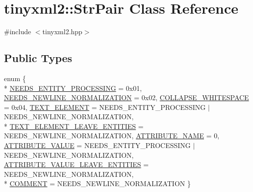 \hypertarget{classtinyxml2_1_1_str_pair}{\section{tinyxml2\-:\-:Str\-Pair Class Reference}
\label{classtinyxml2_1_1_str_pair}
}


{\ttfamily \#include $<$tinyxml2.\-hpp$>$}

\subsection*{Public Types}
\begin{DoxyCompactItemize}
\item 
enum \{ \\*
\hyperlink{classtinyxml2_1_1_str_pair_a0301ef962e15dd94574431f1c61266c5a4f1e01a55f8efe4ca72c32d454060237}{N\-E\-E\-D\-S\-\_\-\-E\-N\-T\-I\-T\-Y\-\_\-\-P\-R\-O\-C\-E\-S\-S\-I\-N\-G} = 0x01, 
\hyperlink{classtinyxml2_1_1_str_pair_a0301ef962e15dd94574431f1c61266c5a8f2045d56e70745d718672c0da91d0e0}{N\-E\-E\-D\-S\-\_\-\-N\-E\-W\-L\-I\-N\-E\-\_\-\-N\-O\-R\-M\-A\-L\-I\-Z\-A\-T\-I\-O\-N} = 0x02, 
\hyperlink{classtinyxml2_1_1_str_pair_a0301ef962e15dd94574431f1c61266c5ab17a85f396c221811fe49263bf6f843f}{C\-O\-L\-L\-A\-P\-S\-E\-\_\-\-W\-H\-I\-T\-E\-S\-P\-A\-C\-E} = 0x04, 
\hyperlink{classtinyxml2_1_1_str_pair_a0301ef962e15dd94574431f1c61266c5aae519eb5a639858591763aa5fc6cc953}{T\-E\-X\-T\-\_\-\-E\-L\-E\-M\-E\-N\-T} = N\-E\-E\-D\-S\-\_\-\-E\-N\-T\-I\-T\-Y\-\_\-\-P\-R\-O\-C\-E\-S\-S\-I\-N\-G $|$ N\-E\-E\-D\-S\-\_\-\-N\-E\-W\-L\-I\-N\-E\-\_\-\-N\-O\-R\-M\-A\-L\-I\-Z\-A\-T\-I\-O\-N, 
\\*
\hyperlink{classtinyxml2_1_1_str_pair_a0301ef962e15dd94574431f1c61266c5a96be48cf899bfeea0aa227f984f1fa63}{T\-E\-X\-T\-\_\-\-E\-L\-E\-M\-E\-N\-T\-\_\-\-L\-E\-A\-V\-E\-\_\-\-E\-N\-T\-I\-T\-I\-E\-S} = N\-E\-E\-D\-S\-\_\-\-N\-E\-W\-L\-I\-N\-E\-\_\-\-N\-O\-R\-M\-A\-L\-I\-Z\-A\-T\-I\-O\-N, 
\hyperlink{classtinyxml2_1_1_str_pair_a0301ef962e15dd94574431f1c61266c5aaab1cbefaa977e6f772b4e2575417aeb}{A\-T\-T\-R\-I\-B\-U\-T\-E\-\_\-\-N\-A\-M\-E} = 0, 
\hyperlink{classtinyxml2_1_1_str_pair_a0301ef962e15dd94574431f1c61266c5a6d72f9ce15f50e8bcd680edf66235dfd}{A\-T\-T\-R\-I\-B\-U\-T\-E\-\_\-\-V\-A\-L\-U\-E} = N\-E\-E\-D\-S\-\_\-\-E\-N\-T\-I\-T\-Y\-\_\-\-P\-R\-O\-C\-E\-S\-S\-I\-N\-G $|$ N\-E\-E\-D\-S\-\_\-\-N\-E\-W\-L\-I\-N\-E\-\_\-\-N\-O\-R\-M\-A\-L\-I\-Z\-A\-T\-I\-O\-N, 
\hyperlink{classtinyxml2_1_1_str_pair_a0301ef962e15dd94574431f1c61266c5a2decbd2513ac14f8befa987938326399}{A\-T\-T\-R\-I\-B\-U\-T\-E\-\_\-\-V\-A\-L\-U\-E\-\_\-\-L\-E\-A\-V\-E\-\_\-\-E\-N\-T\-I\-T\-I\-E\-S} = N\-E\-E\-D\-S\-\_\-\-N\-E\-W\-L\-I\-N\-E\-\_\-\-N\-O\-R\-M\-A\-L\-I\-Z\-A\-T\-I\-O\-N, 
\\*
\hyperlink{classtinyxml2_1_1_str_pair_a0301ef962e15dd94574431f1c61266c5a067a6ec90c8beea1cf5992930d93bffa}{C\-O\-M\-M\-E\-N\-T} = N\-E\-E\-D\-S\-\_\-\-N\-E\-W\-L\-I\-N\-E\-\_\-\-N\-O\-R\-M\-A\-L\-I\-Z\-A\-T\-I\-O\-N
 \}
\end{DoxyCompactItemize}
